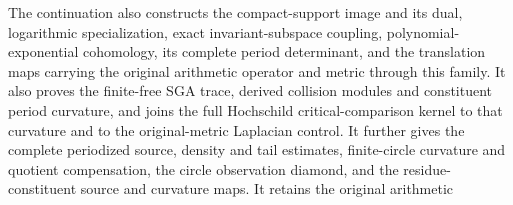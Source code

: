 The continuation also constructs the compact-support image and its dual,
logarithmic specialization, exact invariant-subspace coupling,
polynomial-exponential cohomology, its complete period determinant,
and the translation maps carrying the original arithmetic operator
and metric through this family.
It also proves the finite-free SGA trace, derived collision modules
and constituent period curvature, and joins the full Hochschild
critical-comparison kernel to that curvature and to the
original-metric Laplacian control.
It further gives the complete periodized source, density and tail estimates,
finite-circle curvature and quotient compensation, the circle observation
diamond, and the residue-constituent source and curvature maps.
It retains the original arithmetic